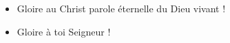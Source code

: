\begin{itemize}
\item[]
Gloire au Christ parole éternelle du Dieu vivant !
\item[]
Gloire à toi Seigneur !
\end{itemize}

